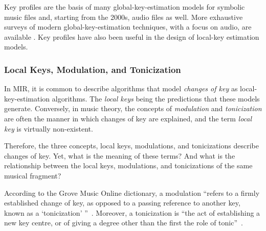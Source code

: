 

Key profiles are the basis of many global-key-estimation models for symbolic music files and, starting from the 2000s, audio files as well. More exhaustive surveys of modern global-key-estimation techniques, with a focus on audio, are available \cite{korzeniowski_harmonic_2018, campbell_automatic_2010}. Key profiles have also been useful in the design of local-key estimation models.

\subsubsection{Local Keys, Modulation, and Tonicization}\label{ssec:terminology}

In MIR, it is common to describe algorithms that model \emph{changes of key} as local-key-estimation algorithms. 
The \emph{local keys} being the predictions that these models generate. Conversely, in music theory, the concepts of \emph{modulation} and \emph{tonicization} are often the manner in which changes of key are explained, and the term \emph{local key} is virtually non-existent.

Therefore, the three concepts, local keys, modulations, and tonicizations describe changes of key. 
Yet, what is the meaning of these terms? And what is the relationship between the local keys, modulations, and tonicizations of the same musical fragment?

According to the Grove Music Online dictionary, a modulation ``refers to a firmly established change of key, as opposed to a passing reference to another key, known as a `tonicization' ''~\cite{saslawgrovemodulation}. Moreover, a tonicization is ``the act of establishing a new key centre, or of giving a degree other than the first the role of tonic''~\cite{drabkintonicization}.

